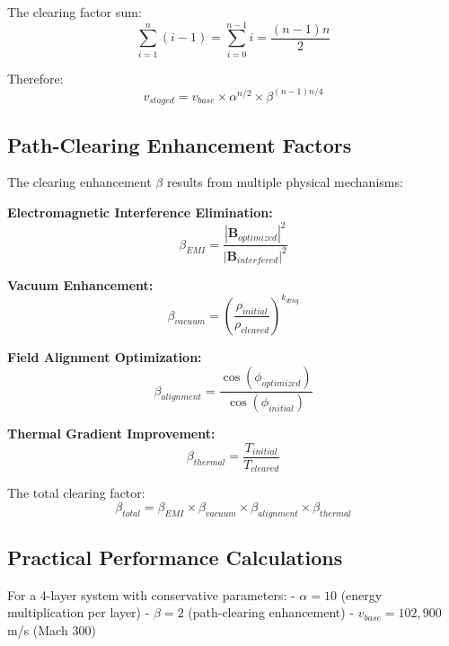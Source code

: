 \documentclass[12pt,a4paper]{article}
\begin{document}
The clearing factor sum:
\begin{equation}
\sum_{i=1}^{n}(i-1) = \sum_{i=0}^{n-1} i = \frac{(n-1)n}{2}
\end{equation}

Therefore:
\begin{equation}
v_{staged} = v_{base} \times \alpha^{n/2} \times \beta^{(n-1)n/4}
\end{equation}

\subsection{Path-Clearing Enhancement Factors}

The clearing enhancement $\beta$ results from multiple physical mechanisms:

\textbf{Electromagnetic Interference Elimination:}
\begin{equation}
\beta_{EMI} = \frac{|\mathbf{B}_{optimized}|^2}{|\mathbf{B}_{interfered}|^2}
\end{equation}

\textbf{Vacuum Enhancement:}
\begin{equation}
\beta_{vacuum} = \left(\frac{\rho_{initial}}{\rho_{cleared}}\right)^{k_{drag}}
\end{equation}

\textbf{Field Alignment Optimization:}
\begin{equation}
\beta_{alignment} = \frac{\cos(\phi_{optimized})}{\cos(\phi_{initial})}
\end{equation}

\textbf{Thermal Gradient Improvement:}
\begin{equation}
\beta_{thermal} = \frac{T_{initial}}{T_{cleared}}
\end{equation}

The total clearing factor:
\begin{equation}
\beta_{total} = \beta_{EMI} \times \beta_{vacuum} \times \beta_{alignment} \times \beta_{thermal}
\end{equation}

\subsection{Practical Performance Calculations}

For a 4-layer system with conservative parameters:
- $\alpha = 10$ (energy multiplication per layer)
- $\beta = 2$ (path-clearing enhancement)
- $v_{base} = 102,900$ m/s (Mach 300)
\end{document}
